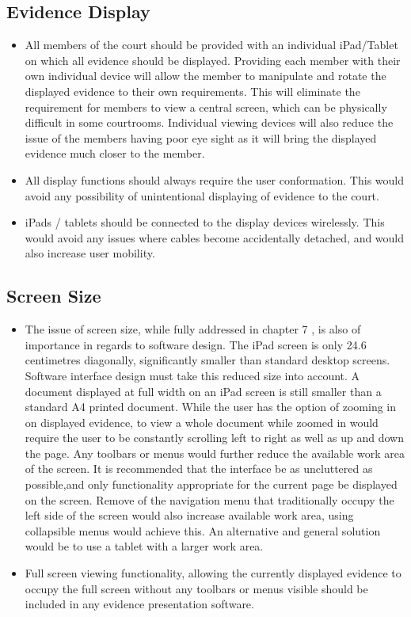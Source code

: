 \subsection{Evidence Display}
\begin{itemize}
    \item All members of the court should be provided with an individual iPad/Tablet on which all evidence should be displayed. Providing each member with their own individual device will allow the member to manipulate and rotate the displayed evidence to their own requirements. This will eliminate the requirement for members to view a central screen, which can be physically difficult in some courtrooms. Individual viewing devices will also reduce the issue of the members having poor eye sight as it will bring the displayed evidence much closer to the member.
    \item All display functions should always require the user conformation. This would avoid any possibility of unintentional displaying of evidence to the court.
    \item iPads / tablets should be connected to the display devices wirelessly. This would avoid any issues where cables become accidentally detached, and would also increase user mobility.
\end{itemize}

\subsection{Screen Size}
\begin{itemize}
    \item The issue of screen size, while fully addressed in chapter \color{red} 7 \color{black}, is also of importance in regards to software design. The iPad screen is only 24.6 centimetres diagonally, significantly smaller than standard desktop screens. Software interface design must take this reduced size into account. A document displayed at full width on an iPad screen is still smaller than a standard A4 printed document. While the user has the option of zooming in on displayed evidence, to view a whole document while zoomed in would require the user to be constantly scrolling left to right as well as up and down the page. Any toolbars or menus would further reduce the available work area of the screen. It is recommended that the interface be as uncluttered as possible,and  only functionality appropriate for the current page be displayed on the screen. Remove of the navigation menu that traditionally occupy the left side of the screen would also increase available work area, using collapsible menus would achieve this. An alternative and general solution would be to use a tablet with a larger work area.
    \item Full screen viewing functionality, allowing the currently displayed evidence to occupy the full screen without any toolbars or menus visible should be included in any evidence presentation software.
    
\end{itemize}

